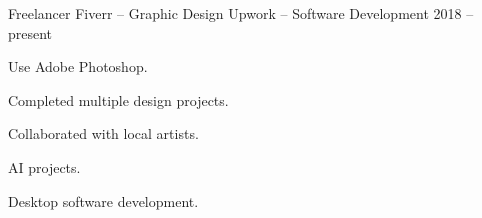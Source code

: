 

\begin{cventries}



  \cventry
    {Freelancer} %
    {Fiverr -- Graphic Design} %
    {Upwork -- Software Development} %
    {2018 -- present} %
    {
      \begin{cvitems} %
        \item {Use Adobe Photoshop.}
        \item {Completed multiple design projects.}
        \item {Collaborated with local artists.}
        \item {AI projects.}
        \item {Desktop software development.}
      \end{cvitems}
    }
    
\end{cventries}
